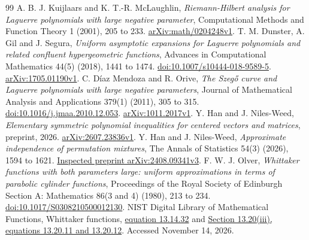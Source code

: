 \documentclass[11pt]{article}
\theoremstyle{definition}
\theoremstyle{remark}
\newcommand{\1}{\mathbf 1}
\begin{document}
\begin{thebibliography}{99}
A. B. J. Kuijlaars and K. T.-R. McLaughlin, \emph{Riemann-Hilbert analysis for Laguerre polynomials with large negative parameter}, Computational Methods and Function Theory 1 (2001), 205 to 233.
\href{https://arxiv.org/abs/math/0204248v1}{arXiv:math/0204248v1}.
T. M. Dunster, A. Gil and J. Segura, \emph{Uniform asymptotic expansions for Laguerre polynomials and related confluent hypergeometric functions}, Advances in Computational Mathematics 44(5) (2018), 1441 to 1474.
\href{https://doi.org/10.1007/s10444-018-9589-5}{doi:10.1007/s10444-018-9589-5}.
\href{https://arxiv.org/abs/1705.01190v1}{arXiv:1705.01190v1}.
C. D\'iaz Mendoza and R. Orive, \emph{The Szeg\H{o} curve and Laguerre polynomials with large negative parameters}, Journal of Mathematical Analysis and Applications 379(1) (2011), 305 to 315.
\href{https://doi.org/10.1016/j.jmaa.2010.12.053}{doi:10.1016/j.jmaa.2010.12.053}.
\href{https://arxiv.org/abs/1011.2017v1}{arXiv:1011.2017v1}.
Y. Han and J. Niles-Weed, \emph{Elementary symmetric polynomial inequalities for centered vectors and matrices}, preprint, 2026.
\href{https://arxiv.org/abs/2607.23836v1}{arXiv:2607.23836v1}.
Y. Han and J. Niles-Weed, \emph{Approximate independence of permutation mixtures}, The Annals of Statistics 54(3) (2026), 1594 to 1621.
\href{https://arxiv.org/abs/2408.09341v3}{Inspected preprint arXiv:2408.09341v3}.
F. W. J. Olver, \emph{Whittaker functions with both parameters large: uniform approximations in terms of parabolic cylinder functions}, Proceedings of the Royal Society of Edinburgh Section A: Mathematics 86(3 and 4) (1980), 213 to 234.
\href{https://doi.org/10.1017/S0308210500012130}{doi:10.1017/S0308210500012130}.
NIST Digital Library of Mathematical Functions, Whittaker functions,
\href{https://dlmf.nist.gov/13.14.E32}{equation 13.14.32} and
\href{https://dlmf.nist.gov/13.20.iii}{Section 13.20(iii), equations 13.20.11 and 13.20.12}.
Accessed November 14, 2026.
\end{thebibliography}
\end{document}
